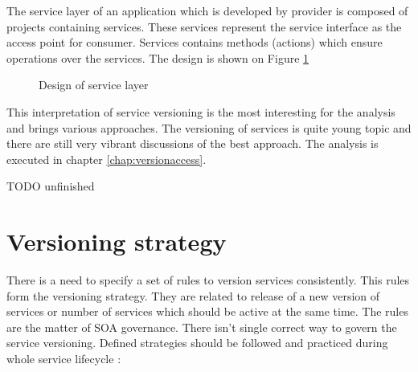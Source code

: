 The service layer of an application which is developed by provider is composed of projects containing services. These services represent the service interface as the access point for consumer. Services contains methods (actions) which ensure operations over the services. The design is shown on Figure \ref{fig:service-layer-design}

\begin{figure}[htp] 
\caption{Design of service layer}
\label{fig:service-layer-design}
\end{figure} 

This interpretation of service versioning is the most interesting for the analysis and brings various approaches. The versioning of services is quite young topic and there are still very vibrant discussions of the best approach. The analysis is executed in chapter \ref{chap:versionaccess}.


TODO unfinished


\section{Versioning strategy}
\label{sec:version-strategy}
There is a need to specify a set of rules to version services consistently. This rules form the versioning strategy. They are related to release of a new version of services or number of services which should be active at the same time. The rules are the matter of SOA governance. There isn't single correct way to govern the service versioning. Defined strategies should be followed and practiced during whole service lifecycle \cite{soa-governance}:

